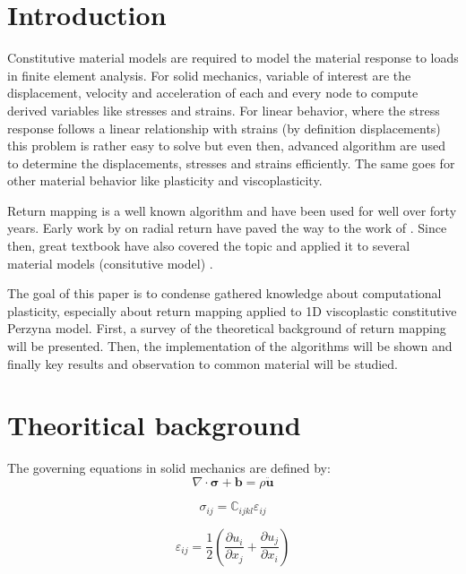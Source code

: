 \documentclass[final,5p,times,twocolumn]{elsarticle}
\begin{document}
\section{Introduction}
\label{sect:intro}
Constitutive material models are required to model the material response to loads in finite element analysis. For solid mechanics, variable of interest are the displacement, velocity and acceleration of each and every node to compute derived variables like stresses and strains. For linear behavior, where the stress response follows a linear relationship with strains (by definition displacements) this problem is rather easy to solve but even then, advanced algorithm are used to determine the displacements, stresses and strains efficiently. The same goes for other material behavior like plasticity and viscoplasticity.

Return mapping is a well known algorithm and have been used for well over forty years. Early work by \cite{Krieg1977RadialReturn} on radial return have paved the way to the work of \cite{Ortiz1985ElastoplasticIntegration}. Since then, great textbook have also covered the topic and applied it to several material models (consitutive model)\cite{Simo1998Computational} \cite{MACrisfield2012}.

The goal of this paper is to condense gathered knowledge about computational plasticity, especially about return mapping applied to 1D viscoplastic constitutive Perzyna model. First, a survey of the theoretical background of return mapping will be presented. Then, the implementation of the algorithms will be shown and finally key results and observation to common material will be studied.

\section{Theoritical background}
\label{sect:theoriticalbackground}
The governing equations in solid mechanics are defined by:
\begin{equation}
  \nabla \cdot \boldsymbol{\sigma} + \boldsymbol{b} = \rho \ddot{\boldsymbol{u}} \label{eq:equilibrium}
\end{equation}

\begin{equation}
   \sigma_{ij}=\mathbb{C}_{ijkl} \varepsilon_{ij} \label{eq:constitutive}
\end{equation} 

\begin{equation} \varepsilon_{ij}=\dfrac{1}{2} \left(\dfrac{\partial u_{i}}{\partial x_{j}} 
                + \dfrac{\partial u_{j}}{\partial x_{i}} \right) \label{eq:straindisprel}
\end{equation}
\end{document}
